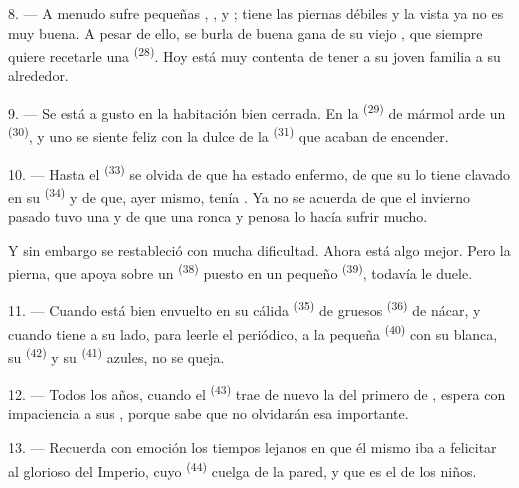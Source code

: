 8. --- A menudo sufre pequeñas , ,
 y ; tiene las piernas débiles y
la vista ya no es muy buena. A pesar de ello, se burla de buena gana de
su viejo , que siempre quiere recetarle una 
\textsuperscript{(28)}. Hoy está muy contenta de tener a su joven familia a su
alrededor.

9. --- Se está a gusto en la habitación bien cerrada. En la
 \textsuperscript{(29)} de mármol arde un 
\textsuperscript{(30)}, y uno se siente feliz con la dulce  de la
 \textsuperscript{(31)} que acaban de encender.

\VUsaut{4.2mm}
\VUsaut{3.0mm}

10. --- Hasta el  \textsuperscript{(33)} se olvida de que ha estado
enfermo, de que su  lo tiene clavado en su 
\textsuperscript{(34)} y de que, ayer mismo, tenía . Ya
no se acuerda de que el invierno pasado tuvo una  y de que
una  ronca y penosa lo hacía sufrir mucho.

Y sin embargo se restableció con mucha dificultad. Ahora está algo mejor.
Pero la pierna, que apoya sobre un  \textsuperscript{(38)} puesto en
un pequeño  \textsuperscript{(39)}, todavía le duele.

11. --- Cuando está bien envuelto en su cálida  \textsuperscript{(35)}
de gruesos  \textsuperscript{(36)} de nácar, y cuando tiene a su
lado, para leerle el periódico, a la pequeña 
\textsuperscript{(40)} con su  blanca, su 
\textsuperscript{(42)} y su  \textsuperscript{(41)} azules, no se queja.

12. --- Todos los años, cuando el  \textsuperscript{(43)} trae de
nuevo la  del primero de , espera con
impaciencia a sus , porque sabe que no olvidarán esa
 importante.

13. --- Recuerda con emoción los tiempos lejanos en que él mismo iba a
felicitar al glorioso  del Imperio, cuyo 
\textsuperscript{(44)} cuelga de la pared, y que es el  de los
niños.
\VUsaut{6.0mm}
\VUfilet{22mm}
